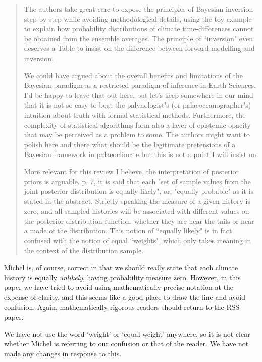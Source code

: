 \documentclass[a4paper,11pt]{article}
\begin{document}
\begin{framed} \begin{quote}
The authors take great care to expose the principles of Bayesian inversion step by step while avoiding methodological details, using the toy example to explain how probability distributions of climate time-differences cannot be obtained from the ensemble averages. The principle of ``inversion" even deserves a Table to insist on the difference between forward modelling and inversion. 

We could have argued about the overall benefits and limitations of the Bayesian paradigm as a restricted paradigm of inference in Earth Sciences. I'd be happy to leave that out here, but let's keep somewhere in our mind that it is not so easy to beat the palynologist's (or palaeoceanographer's) intuition about truth with formal statistical methods. Furthermore, the complexity of statistical algorithms form also a layer of epistemic opacity that may be perceived as a problem to some. The authors might want to polish here and there what should be the legitimate pretensions of a Bayesian framework in palaeoclimate but this is not a point I will insist on. 

More relevant for this review I believe,  the interpretation of posterior priors is arguable. p. 7, it is said that each "set of sample values from the joint posterior distribution is equally likely", or, "equally probable" as it is stated in the abstract. Strictly speaking  the measure of a given history is zero, and all sampled histories will be associated with different values on the posterior distribution function, whether they are near the tails or near a mode of the distribution. This notion of ``equally likely" is in fact confused with the notion of equal ``weights", which only takes meaning in the context of the distribution sample.  
\end{quote} \end{framed}

Michel is, of course, correct in that we should really state that each climate history is equally \textit{unlikely}, having probability measure zero. However, in this paper we have tried to avoid using mathematically precise notation at the expense of clarity, and this seems like a good place to draw the line and avoid confusion. Again, mathematically rigorous readers should return to the RSS paper. 

We have not use the word `weight' or `equal weight' anywhere, so it is not clear whether Michel is referring to our confusion or that of the reader. We have not made any changes in response to this. 
\end{document}
